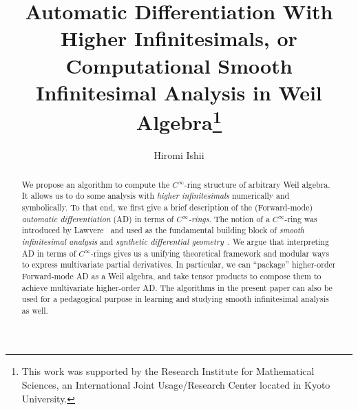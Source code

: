 %
\title{Automatic Differentiation With Higher Infinitesimals, or Computational Smooth Infinitesimal Analysis in Weil Algebra\thanks{This work was supported by the Research Institute for Mathematical Sciences, an International Joint Usage/Research Center located in Kyoto University.
}}
%
%
\author{Hiromi Ishii}
%
%
%
\maketitle              %
\begin{abstract}
  \frenchspacing
  We propose an algorithm to compute the $C^\infty$-ring structure of arbitrary Weil algebra.
  It allows us to do some analysis with \emph{higher infinitesimals} numerically and symbolically.
  To that end, we first give a brief description of the (Forward-mode) \emph{automatic differentiation} (AD) in terms of \emph{$C^\infty$-rings}.
  The notion of a $C^\infty$-ring was introduced by Lawvere~\cite{lawvere1979categorical} and used as the fundamental building block of \emph{smooth infinitesimal analysis} and \emph{synthetic differential geometry}~\cite{Moerdijk:1991aa}.
  We argue that interpreting AD in terms of $C^\infty$-rings gives us a unifying theoretical framework and modular ways to express multivariate partial derivatives.
  In particular, we can ``package'' higher-order Forward-mode AD as a Weil algebra, and take tensor products to compose them to achieve multivariate higher-order AD.
  The algorithms in the present paper can also be used for a pedagogical purpose in learning and studying smooth infinitesimal analysis as well.
\end{abstract}


